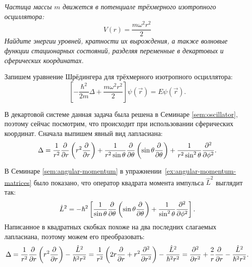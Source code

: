 \begin{exercise}
  \textit{Частица массы $m$ движется в потенциале трёхмерного изотропного
    осциллятора:}
  \[
    V(r) = \frac{m\omega^2r^2}{2}
  \]
  \textit{Найдите энергии уровней, кратности их вырождения, а также волновые
    функции стационарных состояний, разделяя переменные в декартовых и сферических
    координатах.}
\end{exercise}

Запишем уравнение Шрёдингера для трёхмерного изотропного осциллятора:
\[
  \left[-\frac{\hbar^2}{2m}\Delta + \frac{m\omega^2 r^2}{2}\right]\psi(\Vec{r}) = E\psi(\Vec{r}).
\]

В декартовой системе данная задача была решена в Семинаре \ref{sem:oscillator},
поэтому сейчас посмотрим, что происходит при использовании сферических
координат. Сначала выпишем явный вид лапласиана:
\[
  \Delta = \frac{1}{r^2}\frac{\partial }{\partial r}\left(r^2\frac{\partial }{\partial r}\right) + \frac{1}{r^2 \sin\theta}\frac{\partial }{\partial \theta}\left(\sin\theta\frac{\partial }{\partial \theta}\right) + \frac{1}{r^2\sin^2\theta}\frac{\partial^2}{\partial\phi^2}.
\]

В Семинаре \ref{sem:angular-momentum} в упражнении
\textnumero\,\ref{ex:angular-momentum-matrices} было показано, что оператор
квадрата момента импульса $\hat{L}^2$ выглядит так:
\[
  \hat{L}^2 = -\hbar^2\left[\frac{1}{\sin\theta}\frac{\partial }{\partial \theta}\left( \sin\theta\frac{\partial }{\partial \theta} \right) + \frac{1}{\sin^2\theta}\frac{\partial^2}{\partial\phi^2}\right].
\]
Написанное в квадратных скобках похоже на два последних слагаемых лапласиана,
поэтому можем его преобразовать:
\[
  \Delta = \frac{1}{r^2}\frac{\partial }{\partial r}\left(r^2\frac{\partial }{\partial r}\right) - \frac{\hat{L}^2}{\hbar^2 r^2} = \frac{1}{r^2}\left(2r\frac{\partial }{\partial r} + r^2 \frac{\partial^2}{\partial r^2}\right) - \frac{\hat{L}^2}{\hbar^2 r^2} = \frac{\partial^2}{\partial r^2} + \frac{2}{r}\frac{\partial }{\partial r} - \frac{\hat{L}^2}{\hbar^2 r^2}.
\]

